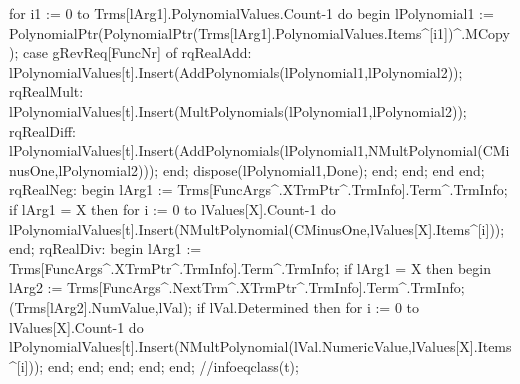                                           for i1 := 0 to Trms[lArg1].PolynomialValues.Count-1 do
                                          begin
                                             lPolynomial1 := PolynomialPtr(PolynomialPtr(Trms[lArg1].PolynomialValues.Items^[i1])^.MCopy);
                                             case gRevReq[FuncNr] of
                                                rqRealAdd:
                                                   lPolynomialValues[t].Insert(AddPolynomials(lPolynomial1,lPolynomial2));
                                                rqRealMult:
                                                   lPolynomialValues[t].Insert(MultPolynomials(lPolynomial1,lPolynomial2));
                                                rqRealDiff:
                                                   lPolynomialValues[t].Insert(AddPolynomials(lPolynomial1,NMultPolynomial(CMinusOne,lPolynomial2)));
                                             end;
                                             dispose(lPolynomial1,Done);
                                          end;
                                       end;
                                    end
                                 end;
                              rqRealNeg:
                                 begin
                                    lArg1 := Trms[FuncArgs^.XTrmPtr^.TrmInfo].Term^.TrmInfo;
                                    if lArg1 = X then
                                       for i := 0 to lValues[X].Count-1 do
                                          lPolynomialValues[t].Insert(NMultPolynomial(CMinusOne,lValues[X].Items^[i]));
                                 end;
                              rqRealDiv:
                                 begin
                                    lArg1 := Trms[FuncArgs^.XTrmPtr^.TrmInfo].Term^.TrmInfo;
                                    if lArg1 = X then
                                    begin
                                       lArg2 := Trms[FuncArgs^.NextTrm^.XTrmPtr^.TrmInfo].Term^.TrmInfo;
                                       (Trms[lArg2].NumValue,lVal);
                                       if lVal.Determined then
                                          for i := 0 to lValues[X].Count-1 do
                                             lPolynomialValues[t].Insert(NMultPolynomial(lVal.NumericValue,lValues[X].Items^[i]));
                                    end;
              end;
                           end;
                        end;
                     end;
                     //infoeqclass(t);

